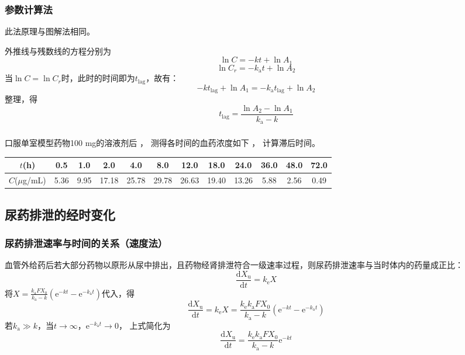 \documentclass[dvipsnames, svgnames, x11names]{beamer}
\begin{document}
\begin{frame}
    \frametitle{参数计算法}
    此法原理与图解法相同。

    外推线与残数线的方程分别为
    \[
        \ln C=-kt+\ln A_1
    \]
    \[
        \ln C_{r}=-k_\mathrm{a}t+\ln A_2
    \]
    当$\ln C = \ln C_{r}$时，此时的时间即为$t_\mathrm{lag}$，故有：
    \[
        -kt_{\mathrm{lag}}+\ln A_{1}=-k_\mathrm{a}t_{\mathrm{lag}}+\ln A_{2}
    \]
    整理，得
    \[
        t_{\mathrm{lag}}=\frac{\ln A_{2} - \ln A_{1}}{k_{\mathrm{a}}-k}
    \]
\end{frame}


\begin{frame}[t]
    \frametitle{}
    \begin{example}
        口服单室模型药物100 mg的溶液剂后 ， 测得各时间的血药浓度如下 ， 计算滞后时间。
        \begin{table}
            \centering
            \small
            \begin{tabular}{cccccccccccc}
                \bottomrule
                $t$(h) & 0.5 & 1.0 & 2.0 & 4.0 & 8.0 & 12.0 & 18.0 & 24.0 & 36.0 & 48.0 & 72.0 \hspace{-9pt} \\ \hline
                $C$($\mu$g/mL) & 5.36 & 9.95 & 17.18 & 25.78 & 29.78 & 26.63 & 19.40 & 13.26 & 5.88 & 2.56 & 0.49 \hspace{-9pt} \\ \toprule 
            \end{tabular}
        \end{table}
    \end{example}
\end{frame}


\subsection{尿药排泄的经时变化}


\begin{frame}
    \frametitle{尿药排泄速率与时间的关系（速度法）}
    血管外给药后若大部分药物以原形从尿中排出，且药物经肾排泄符合一级速率过程，则尿药排泄速率与当时体内的药量成正比：
    \[
        \frac{\mathrm{d}X_\mathrm{u}}{\mathrm{d}t}=k_\mathrm{e}X
    \]
    将$X=\frac{k_\mathrm{a}FX_0}{k_\mathrm{a}-k}(\mathrm{e}^{-kt}-\mathrm{e}^{-k_\mathrm{a}t})$代入，得
    \[
        \frac{\mathrm{d}X_\mathrm{u}}{\mathrm{d}t}=k_\mathrm{e}X=\frac{k_\mathrm{e}k_\mathrm{a}FX_0}{k_\mathrm{a}-k}(\mathrm{e}^{-kt}-\mathrm{e}^{-k_\mathrm{a}t})
    \]
    若$k_\mathrm{a}\gg k$，当$t \to \infty$，$\mathrm{e}^{-k_\mathrm{a}t} \to 0$， 上式简化为
    \[
        \frac{\mathrm{d}X_\mathrm{u}}{\mathrm{d}t}=\frac{k_\mathrm{e}k_\mathrm{a}FX_0}{k_\mathrm{a}-k}\mathrm{e}^{-kt}
    \]
\end{frame}
\end{document}
